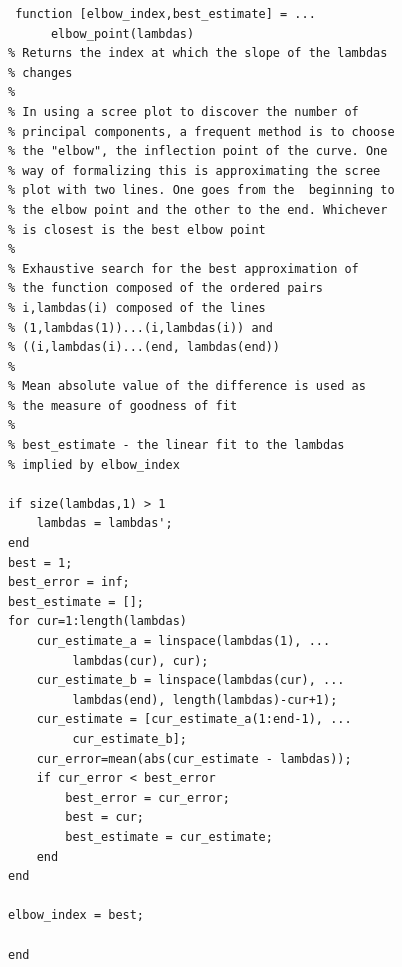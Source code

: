 \documentclass[10pt,letterpaper]{book}
\begin{document}
\begin{lstlisting}
 function [elbow_index,best_estimate] = ...
      elbow_point(lambdas)
% Returns the index at which the slope of the lambdas
% changes
%
% In using a scree plot to discover the number of 
% principal components, a frequent method is to choose
% the "elbow", the inflection point of the curve. One
% way of formalizing this is approximating the scree 
% plot with two lines. One goes from the  beginning to
% the elbow point and the other to the end. Whichever
% is closest is the best elbow point 
%
% Exhaustive search for the best approximation of
% the function composed of the ordered pairs
% i,lambdas(i) composed of the lines
% (1,lambdas(1))...(i,lambdas(i)) and
% ((i,lambdas(i)...(end, lambdas(end))
%
% Mean absolute value of the difference is used as
% the measure of goodness of fit
%
% best_estimate - the linear fit to the lambdas
% implied by elbow_index

if size(lambdas,1) > 1
    lambdas = lambdas';
end
best = 1;
best_error = inf;
best_estimate = [];
for cur=1:length(lambdas)
    cur_estimate_a = linspace(lambdas(1), ...
         lambdas(cur), cur);
    cur_estimate_b = linspace(lambdas(cur), ...
         lambdas(end), length(lambdas)-cur+1);
    cur_estimate = [cur_estimate_a(1:end-1), ...
         cur_estimate_b];
    cur_error=mean(abs(cur_estimate - lambdas));
    if cur_error < best_error
        best_error = cur_error;
        best = cur;
        best_estimate = cur_estimate;
    end
end

elbow_index = best;

end
\end{lstlisting}
\end{document}
